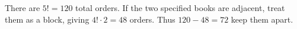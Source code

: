 There are $5!=120$ total orders. If the two specified books are adjacent, treat them as a block, giving $4!\cdot2=48$ orders. Thus $\boxed{120-48=72}$ keep them apart.
